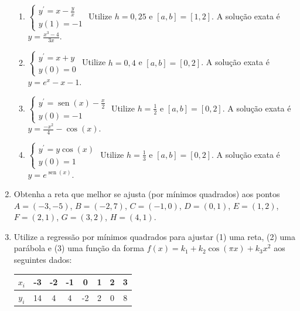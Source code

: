 \documentclass[12pt,a4paper]{article}
\newcommand*\sen{\operatorname{sen}}
\begin{document}
\begin{enumerate}
\begin{enumerate}
\item $\begin{cases}
y^\prime = x-\frac{y}{x} \\
y(1) = -1
\end{cases}$
Utilize $h = 0,25$ e $[a,b] = [1, 2]$. A solução exata é $y = \frac{x^3 - 4}{3x}$.
\item $\begin{cases}
y^\prime = x+y \\
y(0) = 0
\end{cases}$
Utilize $h = 0,4$ e $[a,b] = [0, 2]$. A solução exata é $y = e^x - x - 1$.
\item $\begin{cases}
y^\prime = \sen(x) - \frac{x}{2} \\
y(0) = -1
\end{cases}$
Utilize $h = \frac{1}{2}$ e $[a,b] = [0,2]$. A solução exata é $y = \frac{-x^2}{4} - \cos(x)$.
\item $\begin{cases}
y^\prime = y \cos(x) \\
y(0) = 1
\end{cases}$
Utilize $h = \frac{1}{3}$ e $[a,b] = [0,2]$. A solução exata é $y = e^{\sen(x)}$.
\end{enumerate}

\item Obtenha a reta que melhor se ajusta (por mínimos quadrados) aos pontos
$A = (-3, -5)$,
$B = (-2,  7)$,
$C = (-1,  0)$,
$D = ( 0,  1)$,
$E = ( 1,  2)$,
$F = ( 2,  1)$,
$G = ( 3,  2)$,
$H = ( 4,  1)$.
\item Utilize a regressão por mínimos quadrados para ajustar (1) uma reta, (2) uma parábola e (3) uma função da forma $f(x) = k_1 + k_2 \cos(\pi x) + k_3 x^2$ aos seguintes dados:
\begin{center}
\begin{tabular}{|c|c|c|c|c|c|c|c|}
\hline
   $x_i$ & -3 & -2 & -1 &  0 & 1 & 2 & 3 \\ \hline
$y_i$ & 14 &  4 &  4 & -2 & 2 & 0 & 8 \\ \hline
\end{tabular}
\end{center}
\end{enumerate}
\end{document}
